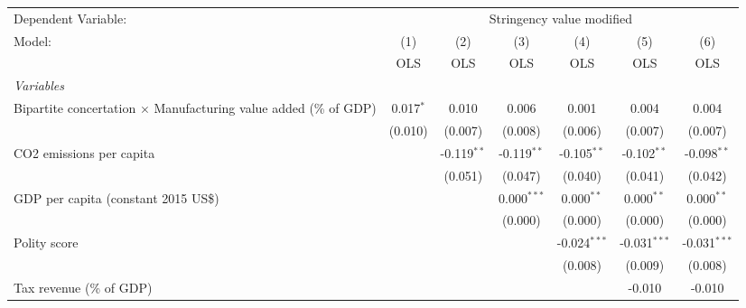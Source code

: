 
\begingroup
\centering
\begin{tabular}{lcccccc}
   \toprule
   Dependent Variable: & \multicolumn{6}{c}{Stringency value modified}\\
   Model:                                                                  & (1)         & (2)           & (3)           & (4)            & (5)            & (6)\\  
                                                                           &  OLS        & OLS           & OLS           & OLS            & OLS            & OLS\\  
   \midrule
   \emph{Variables}\\
   Bipartite concertation $\times$ Manufacturing value added (\% of GDP)   & 0.017$^{*}$ & 0.010         & 0.006         & 0.001          & 0.004          & 0.004\\   
                                                                           & (0.010)     & (0.007)       & (0.008)       & (0.006)        & (0.007)        & (0.007)\\   
   CO2 emissions per capita                                                &             & -0.119$^{**}$ & -0.119$^{**}$ & -0.105$^{**}$  & -0.102$^{**}$  & -0.098$^{**}$\\   
                                                                           &             & (0.051)       & (0.047)       & (0.040)        & (0.041)        & (0.042)\\   
   GDP per capita (constant 2015 US\$)                                     &             &               & 0.000$^{***}$ & 0.000$^{**}$   & 0.000$^{**}$   & 0.000$^{**}$\\   
                                                                           &             &               & (0.000)       & (0.000)        & (0.000)        & (0.000)\\   
   Polity score                                                            &             &               &               & -0.024$^{***}$ & -0.031$^{***}$ & -0.031$^{***}$\\   
                                                                           &             &               &               & (0.008)        & (0.009)        & (0.008)\\   
   Tax revenue (\% of GDP)                                                 &             &               &               &                & -0.010         & -0.010\\   

\end{tabular}
